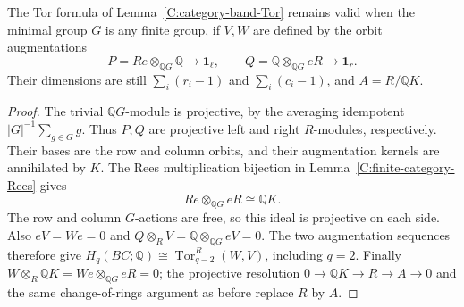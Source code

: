 \begin{lemma}
\label{C:category-group-Tor}
The Tor formula of Lemma~\ref{C:category-band-Tor} remains valid
when the minimal group $G$ is any finite group, if $V,W$ are
defined by the orbit augmentations
\[
 P=Re\otimes_{\mathbb QG}\mathbb Q\longrightarrow\mathbf1_\ell,
 \qquad
 Q=\mathbb Q\otimes_{\mathbb QG}eR\longrightarrow\mathbf1_r.
\]
Their dimensions are still $\sum_i(r_i-1)$ and
$\sum_i(c_i-1)$, and $A=R/\mathbb QK$.
\end{lemma}
\begin{proof}
The trivial $\mathbb QG$-module is projective, by the averaging
idempotent $|G|^{-1}\sum_{g\in G}g$.  Thus $P,Q$ are projective
left and right $R$-modules, respectively.  Their bases are the
row and column orbits, and their augmentation kernels are
annihilated by $K$.  The Rees multiplication bijection in
Lemma~\ref{C:finite-category-Rees} gives
\[
 Re\otimes_{\mathbb QG}eR\cong\mathbb QK.
\]
The row and column $G$-actions are free, so this ideal is
projective on each side.  Also $eV=We=0$ and
$Q\otimes_RV=\mathbb Q\otimes_{\mathbb QG}eV=0$.
The two augmentation sequences therefore give
$H_q(BC;\mathbb Q)\cong\operatorname{Tor}_{q-2}^{R}(W,V)$,
including $q=2$.  Finally
$W\otimes_R\mathbb QK=We\otimes_{\mathbb QG}eR=0$;
the projective resolution $0\to\mathbb QK\to R\to A\to0$
and the same change-of-rings argument as before replace $R$
by $A$.
\end{proof}

